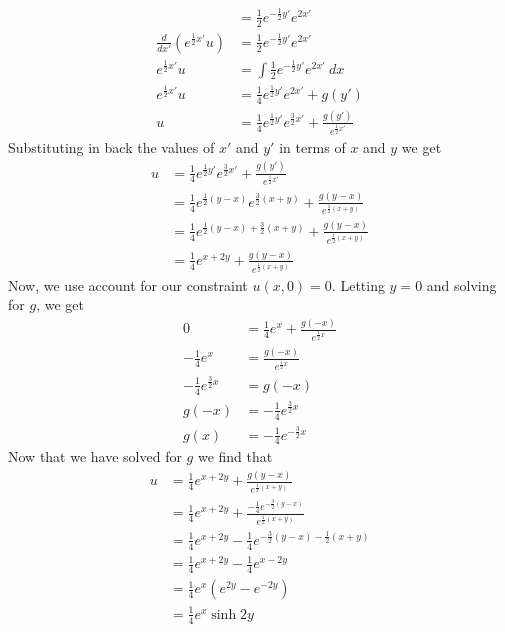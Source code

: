 \documentclass{ben}
\begin{document}
\begin{solution}
\begin{align*}
        &= \frac{1}{2}e^{-\frac{1}{2}y'} e^{2x'}\\
        \frac{d}{dx'} \left(e^{\frac{1}{2}x'} u\right)
        &= \frac{1}{2}e^{-\frac{1}{2}y'} e^{2x'}\\
        e^{\frac{1}{2}x'}u &=
        \int \frac{1}{2} e^{-\frac{1}{2}y'}e^{2x'}\ dx\\
        e^{\frac{1}{2}x'}u &=
        \frac{1}{4} e^{\frac{1}{2}y'} e^{2x'} + g(y')\\
        u &= \frac{1}{4} e^{\frac{1}{2}y'}e^{\frac{3}{2}x'} + \frac{g(y')}{e^{\frac{1}{2}x'}}
    \end{align*}
    Substituting in back the values of $x'$ and $y'$ in terms of $x$ and $y$ we get
    \begin{align*}
        u &= \frac{1}{4} e^{\frac{1}{2}y'} e^{\frac{3}{2}x'} + \frac{g(y')}{e^{\frac{1}{2}x'}}\\
        &= \frac{1}{4} e^{\frac{1}{2}(y - x)} e^{\frac{3}{2}(x + y)} + \frac{g(y - x)}{e^{\frac{1}{2}(x + y)}}\\
        &= \frac{1}{4} e^{\frac{1}{2}(y - x) + \frac{3}{2}(x + y)} + \frac{g(y - x)}{e^{\frac{1}{2}(x + y)}}\\
        &= \frac{1}{4} e^{x + 2y} + \frac{g(y - x)}{e^{\frac{1}{2}(x + y)}}
    \end{align*}
    Now, we use account for our constraint $u(x, 0) = 0$. Letting $y = 0$ and solving for $g$, we get
    \begin{align*}
        0 &= \frac{1}{4}e^{x} + \frac{g(-x)}{e^{\frac{1}{2}x}}\\
        -\frac{1}{4}e^{x} &= \frac{g(-x)}{e^{\frac{1}{2}x}}\\
        -\frac{1}{4}e^{\frac{3}{2}x} &= g(-x)\\
        g(-x) &= -\frac{1}{4}e^{\frac{3}{2}x}\\
        g(x) &= -\frac{1}{4}e^{-\frac{3}{2}x}
    \end{align*}
    Now that we have solved for $g$ we find that
    \begin{align*}
        u &= \frac{1}{4}e^{x + 2y} + \frac{g(y - x)}{e^{\frac{1}{2}(x + y)}}\\
        &= \frac{1}{4}e^{x + 2y} + \frac{-\frac{1}{4}e^{-\frac{3}{2}(y - x)}}{e^{\frac{1}{2}(x + y)}}\\
        &= \frac{1}{4}e^{x + 2y} - \frac{1}{4}e^{-\frac{3}{2}(y - x) - \frac{1}{2}(x + y)}\\
        &= \frac{1}{4}e^{x + 2y} - \frac{1}{4}e^{x - 2y}\\
        &= \frac{1}{4}e^x\left( e^{2y} - e^{-2y} \right)\\
        &= \frac{1}{4}e^x \sinh 2y
    \end{align*}
\end{solution}
\end{document}
